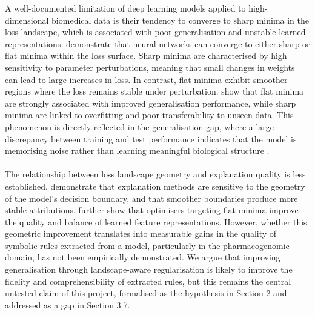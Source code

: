 A well-documented limitation of deep learning models applied to high-dimensional biomedical 
data is their tendency to converge to sharp minima in the loss landscape, which is associated 
with poor generalisation and unstable learned representations. \cite{Li2018} demonstrate 
that neural networks can converge to either sharp or flat minima within the loss surface. 
Sharp minima are characterised by high sensitivity to parameter perturbations, meaning that 
small changes in weights can lead to large increases in loss. In contrast, flat minima exhibit 
smoother regions where the loss remains stable under perturbation. \cite{Li2018} show that flat 
minima are strongly associated with improved generalisation performance, while sharp minima 
are linked to overfitting and poor transferability to unseen data. This phenomenon is directly 
reflected in the generalisation gap, where a large discrepancy between training and test 
performance indicates that the model is memorising noise rather than learning meaningful 
biological structure \cite{Keskar2016}.
\\\\
The relationship between loss landscape geometry and explanation quality is less established. 
\cite{Dombrowski2022} demonstrate that explanation methods are sensitive to the geometry 
of the model's decision boundary, and that smoother boundaries produce more stable 
attributions. \cite{Springer2024} further show that optimisers targeting flat minima 
improve the quality and balance of learned feature representations. However, whether this 
geometric improvement translates into measurable gains in the quality of symbolic rules 
extracted from a model, particularly in the pharmacogenomic domain, has not been empirically 
demonstrated. We argue that improving generalisation through landscape-aware regularisation 
is likely to improve the fidelity and comprehensibility of extracted rules, but this remains 
the central untested claim of this project, formalised as the hypothesis in Section 2 and 
addressed as a gap in Section 3.7.


